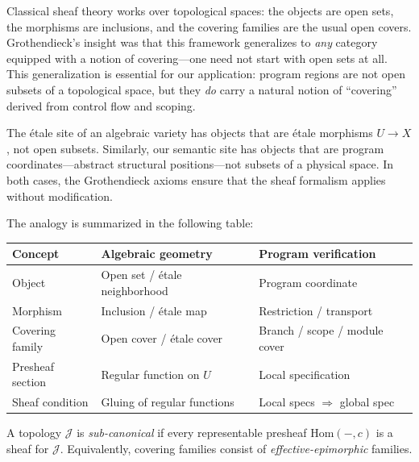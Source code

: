 \documentclass[11pt]{article}
\begin{document}
Classical sheaf theory works over topological spaces: the objects are open sets,
the morphisms are inclusions, and the covering families are the usual open
covers.  Grothendieck's insight was that this framework generalizes to
\emph{any} category equipped with a notion of covering---one need not start
with open sets at all.  This generalization is essential for our application:
program regions are not open subsets of a topological space, but they
\emph{do} carry a natural notion of ``covering'' derived from control flow
and scoping.

\begin{example}
The \'etale site of an algebraic variety has objects that are \'etale
morphisms $U \to X$, not open subsets.  Similarly, our semantic site has
objects that are program coordinates---abstract structural positions---not
subsets of a physical space.  In both cases, the Grothendieck axioms ensure
that the sheaf formalism applies without modification.
\end{example}

The analogy is summarized in the following table:

\medskip
\begin{center}
\begin{tabular}{@{}lll@{}}
\toprule
\textbf{Concept} & \textbf{Algebraic geometry} & \textbf{Program verification} \\
\midrule
Object           & Open set / \'etale neighborhood & Program coordinate \\
Morphism         & Inclusion / \'etale map          & Restriction / transport \\
Covering family  & Open cover / \'etale cover       & Branch / scope / module cover \\
Presheaf section & Regular function on $U$          & Local specification \\
Sheaf condition  & Gluing of regular functions      & Local specs $\Rightarrow$ global spec \\
\bottomrule
\end{tabular}
\end{center}
\medskip

\begin{definition}\label{def:subcanonical}
A topology $\mathscr{J}$ is \emph{sub-canonical} if every representable
presheaf $\mathrm{Hom}(-,c)$ is a sheaf for $\mathscr{J}$.  Equivalently,
covering families consist of \emph{effective-epimorphic} families.
\end{definition}
\end{document}
